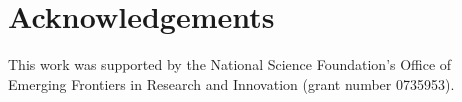 \documentclass[letterpaper]{article}
\begin{document}
\section{Acknowledgements}

This work was supported by the National Science Foundation's Office of
Emerging Frontiers in Research and Innovation (grant number 0735953).


\footnotesize


\end{document}
